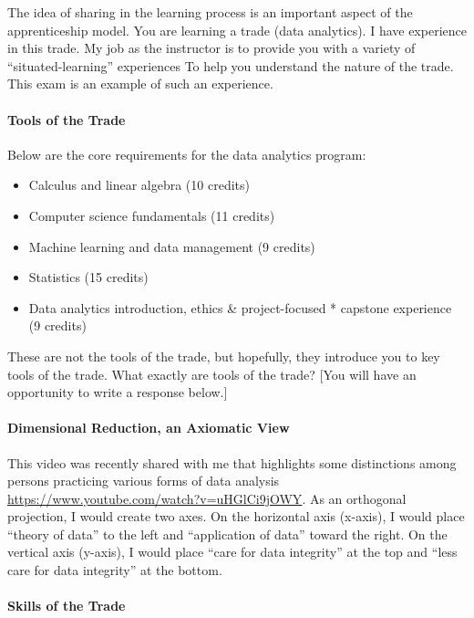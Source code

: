 \documentclass[
]{article}
\providecommand{\tightlist}{%
  \setlength{\itemsep}{0pt}\setlength{\parskip}{0pt}}
\begin{document}
The idea of sharing in the learning process is an important aspect of
the apprenticeship model. You are learning a trade (data analytics). I
have experience in this trade. My job as the instructor is to provide
you with a variety of ``situated-learning'' experiences To help you
understand the nature of the trade. This exam is an example of such an
experience.

\hypertarget{tools-of-the-trade}{%
\paragraph{Tools of the Trade}\label{tools-of-the-trade}}

Below are the core requirements for the data analytics program:

\begin{itemize}
\tightlist
\item
  Calculus and linear algebra (10 credits)
\item
  Computer science fundamentals (11 credits)
\item
  Machine learning and data management (9 credits)
\item
  Statistics (15 credits)
\item
  Data analytics introduction, ethics \& project-focused * capstone
  experience (9 credits)
\end{itemize}

These are not the tools of the trade, but hopefully, they introduce you
to key tools of the trade. What exactly are tools of the trade? {[}You
will have an opportunity to write a response below.{]}

\hypertarget{dimensional-reduction-an-axiomatic-view}{%
\paragraph{Dimensional Reduction, an Axiomatic
View}\label{dimensional-reduction-an-axiomatic-view}}

This video was recently shared with me that highlights some distinctions
among persons practicing various forms of data analysis
\url{https://www.youtube.com/watch?v=uHGlCi9jOWY}. As an orthogonal
projection, I would create two axes. On the horizontal axis (x-axis), I
would place ``theory of data'' to the left and ``application of data''
toward the right. On the vertical axis (y-axis), I would place ``care
for data integrity'' at the top and ``less care for data integrity'' at
the bottom.

\hypertarget{skills-of-the-trade}{%
\paragraph{Skills of the Trade}\label{skills-of-the-trade}}
\end{document}
